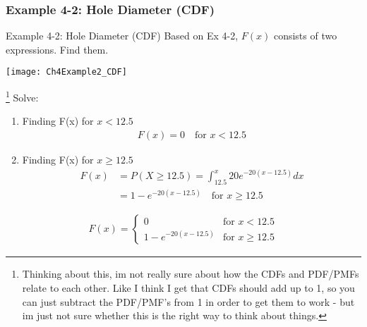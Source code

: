 \documentclass[../INDE315.tex]{subfiles}
\begin{document}
\subsubsection*{Example 4-2: Hole Diameter (CDF)}
\begin{exmp} Example 4-2: Hole Diameter (CDF)
    Based on Ex 4-2, $F(x)$ consists of two expressions. Find them.
    \begin{center}
        \texttt{[image: Ch4Example2\_CDF]}
    \end{center}
\end{exmp}
\footnote{Thinking about this, im not really sure about how the CDFs and PDF/PMFs relate to each other. Like I think I get that CDFs should add up to 1, so you can just subtract the PDF/PMF's from 1 in order to get them to work - but im just not sure whether this is the right way to think about things.}
Solve:
\begin{enumerate}
    \item Finding F(x) for $x < 12.5$
        \begin{equation*}
            \begin{aligned}
                F(x) = 0 \quad \text{for $x < 12.5$}
            \end{aligned}
        \end{equation*}
    \item Finding F(x) for $x \geq 12.5$
        \begin{equation*}
            \begin{aligned}
                F(x) &= P(X \geq 12.5) = \int ^x _{12.5} 20 e^{-20(x-12.5)} dx \\
                    &= 1 - e^{-20(x-12.5)} \quad \text{for $x \geq 12.5$}
            \end{aligned}
        \end{equation*}
\end{enumerate}
\begin{equation*}
    \begin{aligned}
        F(x) = 
            \begin{cases}
                0 & \text{for $x < 12.5$} \\
                1 - e^{-20(x-12.5)} & \text{for $x \geq 12.5$}
            \end{cases}
    \end{aligned}
\end{equation*}
\end{document}
